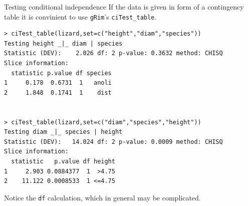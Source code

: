 \documentclass[11pt,handout,aspectratio=169,dvipsnames]{beamer}
\begin{document}

\begin{frame}[fragile]{Testing conditional independence}
If the data is given in form of a contingency table it is convinient to use \texttt{gRim}'s \texttt{ciTest\_table}.
 
\begin{lstlisting}
> ciTest_table(lizard,set=c("height","diam","species"))
Testing height _|_ diam | species 
Statistic (DEV):    2.026 df: 2 p-value: 0.3632 method: CHISQ
Slice information:
  statistic p.value df species
1     0.178  0.6731  1   anoli
2     1.848  0.1741  1    dist


> ciTest_table(lizard,set=c("diam","species","height"))
Testing diam _|_ species | height 
Statistic (DEV):   14.024 df: 2 p-value: 0.0009 method: CHISQ
Slice information:
  statistic   p.value df height
1     2.903 0.0884377  1  >4.75
2    11.122 0.0008533  1 <=4.75
\end{lstlisting}
Notice the \texttt{df} calculation, which in general may be complicated.

\end{frame}


%	
\end{document}
